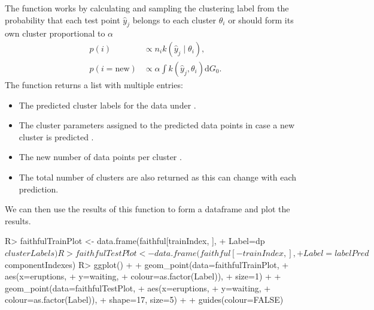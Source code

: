 \documentclass[nojss]{jss}
\begin{document}
The function  works by calculating and sampling the clustering label from the probability that each test point $\hat{y} _j$ belongs to each cluster $\theta _i$ or should form its own cluster proportional to $\alpha$
\begin{align*}
p(i) & \propto n_i k(\hat{y} _j \mid \theta _i), \\
p(i=\text{new}) & \propto \alpha \int k(\hat{y} _j , \theta _i) \mathrm{d} G_0.
\end{align*}
The function returns a list with multiple entries:
\begin{itemize}
\item The predicted cluster labels for the data under .
\item The cluster parameters assigned to the predicted data points in case a new cluster is predicted .
\item The new number of data points per cluster .
\item The total number of clusters are also returned  as this can change with each prediction.
\end{itemize}


We can then use the results of this function to form a dataframe and plot the results.

\begin{Schunk}
\begin{Sinput}
R> faithfulTrainPlot <- data.frame(faithful[trainIndex, ],
+                                  Label=dp$clusterLabels)
R> faithfulTestPlot <- data.frame(faithful[-trainIndex, ],
+                                 Label=labelPred$componentIndexes)
R> ggplot() +
+      geom_point(data=faithfulTrainPlot,
+                 aes(x=eruptions,
+                     y=waiting,
+                     colour=as.factor(Label)),
+                 size=1) +
+      geom_point(data=faithfulTestPlot,
+                 aes(x=eruptions,
+                     y=waiting,
+                     colour=as.factor(Label)),
+                 shape=17, size=5) +
+    guides(colour=FALSE)
\end{Sinput}
\end{Schunk}
\end{document}
